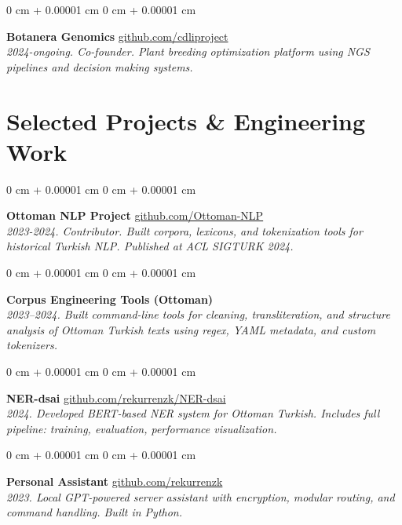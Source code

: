 \documentclass[10pt, letterpaper]{article}
\newenvironment{onecolentry}{
    \begin{adjustwidth}{
        0 cm + 0.00001 cm
    }{
        0 cm + 0.00001 cm
    }
}{
    \end{adjustwidth}
} %
\begin{document}
\begin{onecolentry}
    \textbf{Botanera Genomics} \hfill \href{https://github.com/rekurrenzk/DiscordBot}{github.com/cdliproject} \\
    \textit{2024-ongoing. Co-founder. Plant breeding optimization platform using NGS pipelines and decision making systems.}
\end{onecolentry}


\section{Selected Projects \& Engineering Work}

\begin{onecolentry}
    \textbf{Ottoman NLP Project} \hfill \href{https://github.com/Ottoman-NLP}{github.com/Ottoman-NLP} \\
    \textit{2023-2024. Contributor. Built corpora, lexicons, and tokenization tools for historical Turkish NLP. Published at ACL SIGTURK 2024.}
\end{onecolentry}
\vspace{0.2cm}

\begin{onecolentry}
    \textbf{Corpus Engineering Tools (Ottoman)} \\
    \textit{2023–2024. Built command-line tools for cleaning, transliteration, and structure analysis of Ottoman Turkish texts using regex, YAML metadata, and custom tokenizers.}
\end{onecolentry}
\vspace{0.2cm}

\begin{onecolentry}
    \textbf{NER-dsai} \hfill \href{https://github.com/rekurrenzk/NER-dsai}{github.com/rekurrenzk/NER-dsai} \\
    \textit{2024. Developed BERT-based NER system for Ottoman Turkish. Includes full pipeline: training, evaluation, performance visualization.}
\end{onecolentry}
\vspace{0.2cm}

\begin{onecolentry}
    \textbf{Personal Assistant} \hfill \href{https://github.com/rekurrenzk}{github.com/rekurrenzk} \\
    \textit{2023. Local GPT-powered server assistant with encryption, modular routing, and command handling. Built in Python.}
\end{onecolentry}
\end{document}
